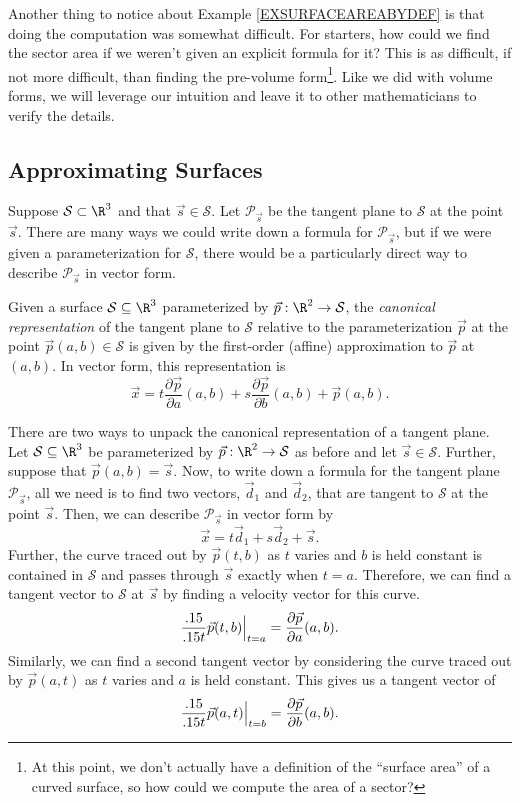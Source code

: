 Another thing to notice about Example \ref{EXSURFACEAREABYDEF} is that doing the
computation was somewhat difficult.
For starters, how could we find the sector area if we weren't given an explicit formula for it?
This is as difficult, if not more difficult, than finding the pre-volume form\footnote{
At this point, we don't actually have a definition of the ``surface area'' of a curved surface, 
so how could we compute the area of a sector?}.  Like we did with volume forms, we will leverage
our intuition and leave it to other mathematicians to verify the details.

\subsection{Approximating Surfaces}

Suppose $\mathcal S\subset \R^3$ and that $\vec s\in\mathcal S$.  Let $\mathcal P_{\vec s}$ be the
tangent plane to $\mathcal S$ at the point $\vec s$.  There are many ways we could write down
a formula for $\mathcal P_{\vec s}$, but if we were given a parameterization for $\mathcal S$,
there would be a particularly direct way to describe $\mathcal P_{\vec s}$ in vector form.

\begin{definition}
	Given a surface $\mathcal S\subseteq\R^3$ parameterized by $\vec p:\R^2\to\mathcal S$,
	the \emph{canonical representation} of the tangent plane to $\mathcal S$
	relative to the parameterization $\vec p$
	at the point $\vec p(a,b)\in\mathcal S$ is given by the first-order
	(affine) approximation to $\vec p$ at $(a,b)$.  In vector form, this representation
	is
	\[
		\vec x = t \frac{\partial \vec p}{\partial a}(a,b) + s\frac{\partial \vec p}{\partial b}(a,b)
		+\vec p(a,b).
	\]
\end{definition}

There are two ways to unpack the canonical representation of a tangent plane.
Let $\mathcal S\subseteq\R^3$ be parameterized by $\vec p:\R^2\to\mathcal S$ as before
and let $\vec s\in\mathcal S$.  Further, suppose that $\vec p(a,b)=\vec s$.  Now,
to write down a formula for the tangent plane $\mathcal P_{\vec s}$, all we need is to
find two vectors, $\vec d_1$ and $\vec d_2$, that are tangent to $\mathcal S$ at the point $\vec s$.
Then, we can describe $\mathcal P_{\vec s}$ in vector form by
\[
	\vec x=t\vec d_1+s\vec d_2+\vec s.
\]
Further, the curve traced out by $\vec p(t,b)$ as $t$ varies and $b$ is held constant is
contained in $\mathcal S$ and passes through $\vec s$ exactly when $t=a$.  Therefore, we can
find a tangent vector to $\mathcal S$ at $\vec s$ by finding a velocity vector for this curve.
\[
	\frac{.15}{.15 t} \vec p(t,b)\Big|_{t=a} = \frac{\partial \vec p}{\partial a}(a,b).
\]
Similarly, we can find a second tangent vector by considering the curve traced out by $\vec p(a,t)$
as $t$ varies and $a$ is held constant.  This gives us a tangent vector of
\[
	\frac{.15}{.15 t} \vec p(a,t)\Big|_{t=b} = \frac{\partial \vec p}{\partial b}(a,b).
\]

